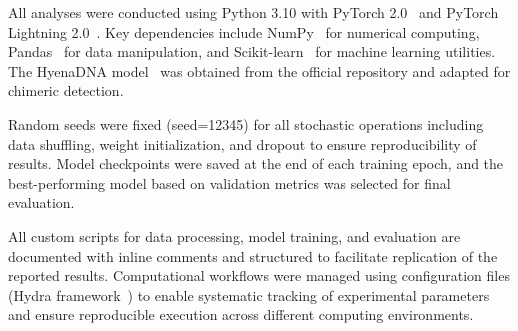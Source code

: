 \documentclass[pdflatex,sn-nature]{sn-jnl}%
\theoremstyle{thmstyleone}%
\theoremstyle{thmstyletwo}%
\theoremstyle{thmstylethree}%
\begin{document}
All analyses were conducted using Python 3.10 with PyTorch 2.0~\cite{paszke2019pytorch} and PyTorch Lightning 2.0~\cite{Falcon_PyTorch_Lightning_2019}.
Key dependencies include NumPy~\cite{harris2020array} for numerical computing, Pandas~\cite{mckinney2010data} for data manipulation, and Scikit-learn~\cite{pedregosa2011scikit} for machine learning utilities.
The HyenaDNA model~\cite{nguyen2023hyenadna} was obtained from the official repository and adapted for chimeric detection.

Random seeds were fixed (seed=12345) for all stochastic operations including data shuffling, weight initialization, and dropout to ensure reproducibility of results.
Model checkpoints were saved at the end of each training epoch, and the best-performing model based on validation metrics was selected for final evaluation.

All custom scripts for data processing, model training, and evaluation are documented with inline comments and structured to facilitate replication of the reported results.
Computational workflows were managed using configuration files (Hydra framework~\cite{Yadan2019Hydra}) to enable systematic tracking of experimental parameters and ensure reproducible execution across different computing environments.

\backmatter


\makeatletter
\renewcommand{\theHfigure}{extended.\thefigure}
\renewcommand{\theHtable}{extended.\thetable}
\makeatother

\renewcommand{\figurename}{Extended Data Fig.}
\renewcommand{\tablename}{Extended Data Table}
\setcounter{figure}{0}
\setcounter{table}{0}
\end{document}

